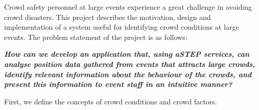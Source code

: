 \begin{center}
Crowd safety personnel at large events experience a great challenge in avoiding crowd disasters. This project describes the motivation, design and implementation of a system useful for identifying crowd conditions at large events. The problem statement of the project is as follows:

\textbf{\textit{How can we develop an application that, using aSTEP services, can analyse position data gathered from events that attracts large crowds, identify relevant information about the behaviour of the crowds, and present this information to event staff in an intuitive manner?}}

First, we define the concepts of crowd conditions and crowd factors. 




\end{center}
